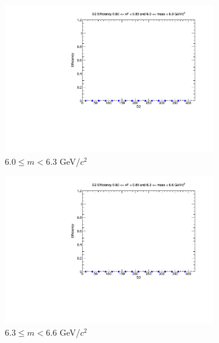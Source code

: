 \begin{figure}[p]
\begin{subfigure}[b]{0.32\textwidth}
        \includegraphics[width=\textwidth]{./kTrackerEfficiencyPlots/D2_Efficiency_xF16_mass6.pdf}
        \caption{$6.0 \leq m < 6.3$ GeV/$c^2$}
        \label{fig:xF16_mass6}
    \end{subfigure}
    \hfill
    \begin{subfigure}[b]{0.32\textwidth}
        \centering
        \includegraphics[width=\textwidth]{./kTrackerEfficiencyPlots/D2_Efficiency_xF16_mass7.pdf}
        \caption{$6.3 \leq m < 6.6$ GeV/$c^2$}
        \label{fig:xF16_mass7}
    \end{subfigure}
    \hfill
    \begin{subfigure}[b]{0.32\textwidth}
        \centering

\end{subfigure}
\end{figure}
